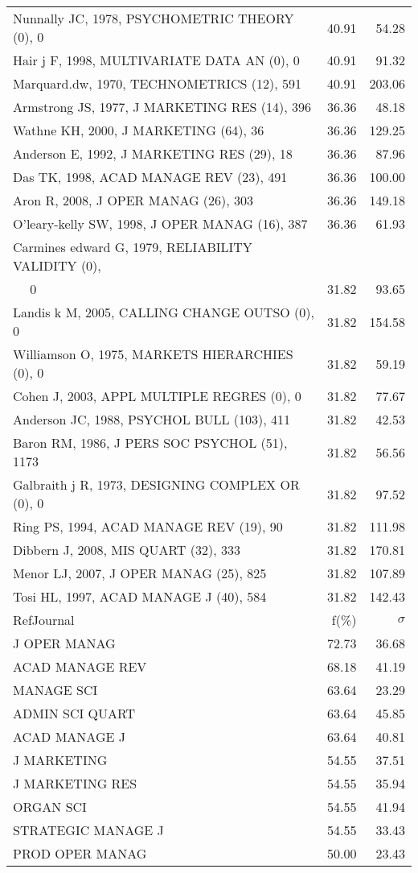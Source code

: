 \documentclass[a4paper,11pt]{report}
\begin{document}
\begin{landscape}
\begin{table}[!ht]
{\begin{tabular}{|l r r|}
Nunnally JC, 1978, PSYCHOMETRIC THEORY (0), 0 & 40.91 & 54.28\\
Hair j F, 1998, MULTIVARIATE DATA AN (0), 0 & 40.91 & 91.32\\
Marquard.dw, 1970, TECHNOMETRICS (12), 591 & 40.91 & 203.06\\
Armstrong JS, 1977, J MARKETING RES (14), 396 & 36.36 & 48.18\\
Wathne KH, 2000, J MARKETING (64), 36 & 36.36 & 129.25\\
Anderson E, 1992, J MARKETING RES (29), 18 & 36.36 & 87.96\\
Das TK, 1998, ACAD MANAGE REV (23), 491 & 36.36 & 100.00\\
Aron R, 2008, J OPER MANAG (26), 303 & 36.36 & 149.18\\
O'leary-kelly SW, 1998, J OPER MANAG (16), 387 & 36.36 & 61.93\\
Carmines edward G, 1979, RELIABILITY VALIDITY (0), &  & \\
$\quad$ 0 & 31.82 & 93.65\\
Landis k M, 2005, CALLING CHANGE OUTSO (0), 0 & 31.82 & 154.58\\
Williamson O, 1975, MARKETS HIERARCHIES (0), 0 & 31.82 & 59.19\\
Cohen J, 2003, APPL MULTIPLE REGRES (0), 0 & 31.82 & 77.67\\
Anderson JC, 1988, PSYCHOL BULL (103), 411 & 31.82 & 42.53\\
Baron RM, 1986, J PERS SOC PSYCHOL (51), 1173 & 31.82 & 56.56\\
Galbraith j R, 1973, DESIGNING COMPLEX OR (0), 0 & 31.82 & 97.52\\
Ring PS, 1994, ACAD MANAGE REV (19), 90 & 31.82 & 111.98\\
Dibbern J, 2008, MIS QUART (32), 333 & 31.82 & 170.81\\
Menor LJ, 2007, J OPER MANAG (25), 825 & 31.82 & 107.89\\
Tosi HL, 1997, ACAD MANAGE J (40), 584 & 31.82 & 142.43\\
\hline
\hline
RefJournal & f(\%) & $\sigma$\\
\hline
J OPER MANAG & 72.73 & 36.68\\
ACAD MANAGE REV & 68.18 & 41.19\\
MANAGE SCI & 63.64 & 23.29\\
ADMIN SCI QUART & 63.64 & 45.85\\
ACAD MANAGE J & 63.64 & 40.81\\
J MARKETING & 54.55 & 37.51\\
J MARKETING RES & 54.55 & 35.94\\
ORGAN SCI & 54.55 & 41.94\\
STRATEGIC MANAGE J & 54.55 & 33.43\\
PROD OPER MANAG & 50.00 & 23.43\\
\hline
\end{tabular}
}
\end{table}

\end{landscape}
\end{document}
